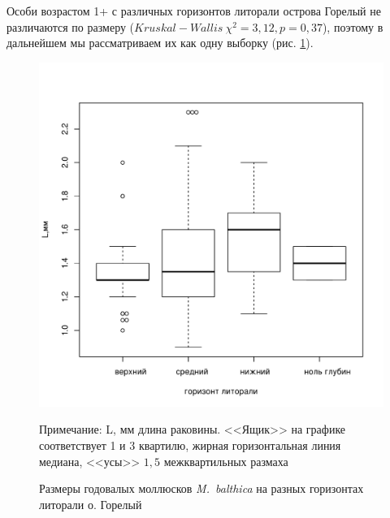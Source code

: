 Особи возрастом 1+ с различных горизонтов литорали острова Горелый не различаются по размеру ($Kruskal-Wallis\ \chi^2 = 3,12, p = 0,37$), поэтому в дальнейшем мы рассматриваем их как одну выборку (рис. \ref{ris:Goreliy_length1+_gorizonty}).
	\begin{figure}[p]
		\includegraphics{../White_Sea/growth_young/boxplot_Goreliy_length_1+_tidal.pdf}
	\caption{Размеры  годовалых моллюсков {\it M.~balthica} на разных горизонтах литорали о. Горелый}
	\label{ris:Goreliy_length1+_gorizonty}
	{\footnotesize Примечание: L, мм \textemdash длина раковины. <<Ящик>> на графике соответствует 1 и 3 квартилю, жирная горизонтальная линия \textemdash 		медиана, <<усы>> \textemdash $1,5$ межквартильных размаха}
	\end{figure}

